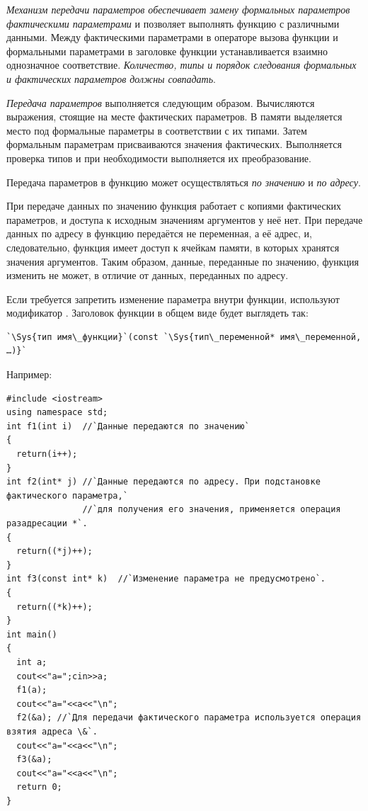 \emph{Механизм передачи параметров обеспечивает замену формальных параметров фактическими параметрами} и
позволяет выполнять функцию с различными данными. Между фактическими параметрами в операторе вызова функции и
формальными параметрами в заголовке функции устанавливается взаимно однозначное соответствие.
\emph{Количество, типы и порядок следования формальных и фактических параметров должны совпадать}.

\emph{Передача параметров} выполняется следующим образом. Вычисляются выражения,
стоящие на месте фактических параметров. В памяти выделяется место под формальные параметры в соответствии с их
типами. Затем формальным параметрам присваиваются значения фактических. Выполняется проверка типов и при необходимости
выполняется их преобразование. %

Передача параметров в функцию может осуществляться \emph{по
значению} и \emph{по адресу}. 

При передаче данных по значению функция работает с копиями фактических параметров, и доступа к исходным значениям
аргументов у неё нет. При передаче данных по адресу в функцию передаётся не переменная, а её адрес, и, следовательно,
функция имеет доступ к ячейкам памяти, в которых хранятся значения аргументов. Таким образом, данные, переданные по
значению, функция изменить не может, в отличие от данных, переданных по адресу. 

Если требуется запретить изменение параметра внутри функции, используют модификатор . Заголовок
функции в общем виде будет выглядеть так:
\begin{lstlisting}
`\Sys{тип имя\_функции}`(const `\Sys{тип\_переменной* имя\_переменной, …)}`
\end{lstlisting}

Например:
\begin{lstlisting}
#include <iostream>
using namespace std;
int f1(int i)  //`Данные передаются по значению`
{
  return(i++);
}
int f2(int* j) //`Данные передаются по адресу. При подстановке фактического параметра,` 
               //`для получения его значения, применяется операция разадресации *`.
{
  return((*j)++);
}
int f3(const int* k)  //`Изменение параметра не предусмотрено`.
{
  return((*k)++);
}
int main()
{
  int a;
  cout<<"a=";cin>>a;
  f1(a);
  cout<<"a="<<a<<"\n";
  f2(&a); //`Для передачи фактического параметра используется операция взятия адреса \&`.
  cout<<"a="<<a<<"\n";
  f3(&a);
  cout<<"a="<<a<<"\n";
  return 0;
}
\end{lstlisting}

